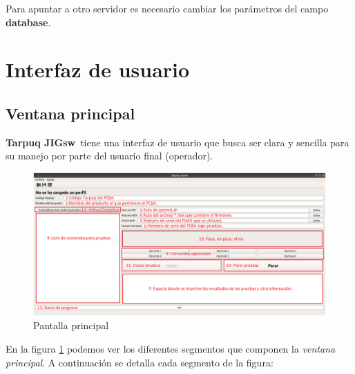 \documentclass[a4paper,12pt]{refart}
\newcommand\tarpuqJIGsw{\textbf{Tarpuq JIGsw}}
\begin{document}
Para apuntar a otro servidor es necesario cambiar los parámetros del campo \textbf{database}.

\section{Interfaz de usuario}
\subsection{Ventana principal}
\tarpuqJIGsw\ tiene una interfaz de usuario que busca ser clara y sencilla para su manejo por parte del usuario final (operador).

\begin{figure}[hbt!]\centering
\includegraphics[width=\textwidth, frame]{images/main_new_description} 
\caption{Pantalla principal}
\label{fig:mainDescription}
\end{figure}

En la figura \ref{fig:mainDescription} podemos ver los diferentes segmentos que componen la \textit{ventana principal}. A continuación se detalla cada segmento de la figura:
\end{document}

